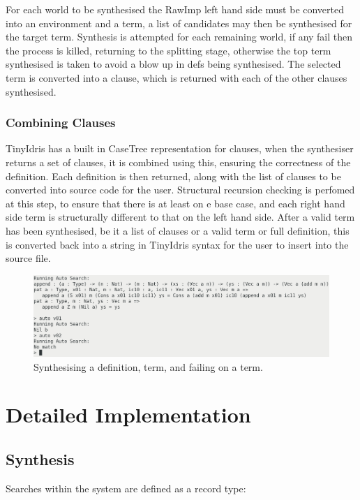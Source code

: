 \documentclass[a4paper]{article}
\begin{document}
For each world to be synthesised the RawImp left hand side must be 
converted into an environment and a term, a list of candidates may then be 
synthesised for the target term. Synthesis is attempted for each remaining world, 
if any fail then the process is killed, returning to the splitting stage, otherwise the top term synthesised
is taken to avoid a blow up in defs being synthesised. The selected term is
converted into a clause, which is returned with each of the other clauses synthesised. 

\subsubsection{Combining Clauses}
\label{sec:org909acde}
TinyIdris has a built in CaseTree representation for clauses, when the synthesiser
returns a set of clauses, it is combined using this, ensuring the correctness
of the definition. Each definition is then returned, along with the list of clauses
to be converted into source code for the user. Structural recursion
checking is perfomed at this step, to ensure that there is at least on e base case, and each right hand side term is structurally different 
to that on the left hand side. 
After a valid term has been synthesised, be it a list of clauses or a valid term or 
full definition, this is converted back into a string in TinyIdris syntax for
the user to insert into the source file. 

\begin{center}
\begin{figure}[htbp]
\centering
\includegraphics[scale=0.25]{./Resource/running.png}
\caption{Synthesising a definition, term, and failing on a term.}
\end{figure}
\end{center}

\clearpage

\section{Detailed Implementation}

\subsection{Synthesis}
Searches within the system are defined as a record type:
\end{document}
